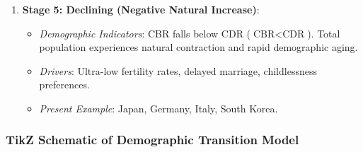 \documentclass[11pt,a4paper]{article}
\begin{document}
\begin{enumerate}[leftmargin=*]
  \item \textbf{Stage 5: Declining (Negative Natural Increase)}:
  \begin{itemize}
    \item \textit{Demographic Indicators}: CBR falls below CDR ($\text{CBR} < \text{CDR}$). Total population experiences natural contraction and rapid demographic aging.
    \item \textit{Drivers}: Ultra-low fertility rates, delayed marriage, childlessness preferences.
    \item \textit{Present Example}: Japan, Germany, Italy, South Korea.
  \end{itemize}
\end{enumerate}

\subsubsection{TikZ Schematic of Demographic Transition Model}
\end{document}
